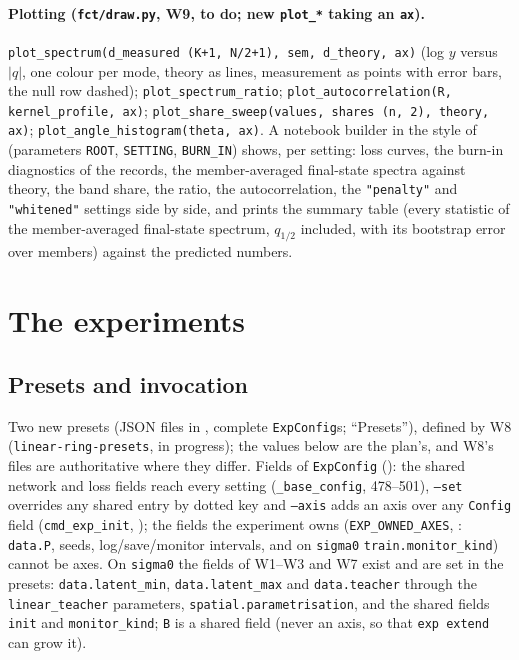 \documentclass[11pt,a4paper]{article}
\newcommand{\code}[1]{\texttt{#1}}
\begin{document}
\paragraph{Plotting (\code{fct/draw.py}, W9, to do; new \code{plot\_*} taking an \code{ax}).} \code{plot\_spectrum(d\_measured (K+1, N/2+1), sem, d\_theory, ax)} (log $y$ versus $|q|$, one colour per mode, theory as lines, measurement as points with error bars, the null row dashed); \code{plot\_spectrum\_ratio}; \code{plot\_autocorrelation(R, kernel\_profile, ax)}; \code{plot\_share\_sweep(values, shares (n, 2), theory, ax)}; \code{plot\_angle\_histogram(theta, ax)}. A notebook builder  in the style of  (parameters \code{ROOT}, \code{SETTING}, \code{BURN\_IN}) shows, per setting: loss curves, the burn-in diagnostics of the records, the member-averaged final-state spectra against theory, the band share, the ratio, the autocorrelation, the \code{"penalty"} and \code{"whitened"} settings side by side, and prints the summary table (every statistic of the member-averaged final-state spectrum, $q_{1/2}$ included, with its bootstrap error over members) against the predicted numbers.

\section{The experiments}
\label{sec:experiments}

\subsection{Presets and invocation}
\label{sec:presets}
Two new presets (JSON files in , complete \code{ExpConfig}s;  ``Presets''), defined by W8 (\code{linear-ring-presets}, in progress); the values below are the plan's, and W8's files are authoritative where they differ. Fields of \code{ExpConfig} (): the shared network and loss fields reach every setting (\code{\_base\_config}, 478--501), \code{--set} overrides any shared entry by dotted key and \code{--axis} adds an axis over any \code{Config} field (\code{cmd\_exp\_init}, ); the fields the experiment owns (\code{EXP\_OWNED\_AXES}, : \code{data.P}, seeds, log/save/monitor intervals, and on \code{sigma0} \code{train.monitor\_kind}) cannot be axes. On \code{sigma0} the fields of W1--W3 and W7 exist and are set in the presets: \code{data.latent\_min}, \code{data.latent\_max} and \code{data.teacher} through the \code{linear\_teacher} parameters, \code{spatial.parametrisation}, and the shared fields \code{init} and \code{monitor\_kind}; \code{B} is a shared field (never an axis, so that \code{exp extend} can grow it).
\end{document}
